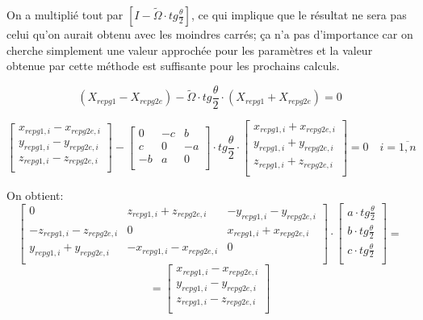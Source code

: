 \documentclass[french]{report}
\begin{document}
\begin{itemize}
On a multiplié tout par $[I-\widetilde\Omega \cdot tg \frac{\theta}{2}]$, ce qui implique que le résultat ne sera pas celui qu'on aurait obtenu avec les moindres carrés; ça n'a pas d'importance car on cherche simplement une valeur approchée pour les paramètres et la valeur obtenue par cette méthode est suffisante pour les prochains calculs.

$$(X_{repg1}-X_{repg2e})-\widetilde\Omega \cdot tg \frac{\theta}{2} \cdot (X_{repg1}+X_{repg2e})=0$$

$$\begin{bmatrix} x_{repg1,i}-x_{repg2e,i} \\y_{repg1,i}-y_{repg2e,i} \\ z_{repg1,i}-z_{repg2e,i} \\ \end{bmatrix} - \begin{bmatrix} 0 & -c & b \\
c & 0 & -a\\
-b & a & 0\\ \end{bmatrix} \cdot tg\frac{\theta}{2} \cdot
\begin{bmatrix} x_{repg1,i}+x_{repg2e,i} \\y_{repg1,i}+y_{repg2e,i} \\ z_{repg1,i}+z_{repg2e,i} \\ \end{bmatrix} = 0 \quad i=\overline{1,n}$$

On obtient:
$$\begin{bmatrix} 0 & z_{repg1,i}+z_{repg2e,i} & -y_{repg1,i}-y_{repg2e,i} \\
-z_{repg1,i}-z_{repg2e,i} & 0 & x_{repg1,i}+x_{repg2e,i}\\
y_{repg1,i}+y_{repg2e,i} & -x_{repg1,i}-x_{repg2e,i} & 0 \\ \end{bmatrix} \cdot
\begin{bmatrix} a \cdot tg \frac{\theta}{2} \\ b \cdot tg \frac{\theta}{2} \\ c \cdot tg \frac{\theta}{2}\\ \end{bmatrix} =$$
$$ = \begin{bmatrix} x_{repg1,i}-x_{repg2e,i} \\y_{repg1,i}-y_{repg2e,i} \\ z_{repg1,i}-z_{repg2e,i} \\ \end{bmatrix} $$


\end{itemize}
\end{document}
